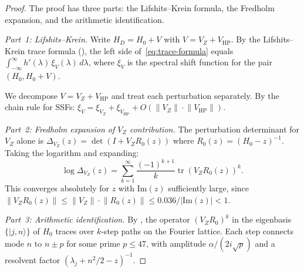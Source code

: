 \documentclass[11pt,a4paper]{article}
\theoremstyle{plain}
\theoremstyle{remark}
\DeclareMathOperator{\tr}{tr}
\newcommand{\norm}[1]{\lVert #1 \rVert}
\begin{document}
\begin{proof}
The proof has three parts: the Lifshits--Krein formula, the Fredholm
expansion, and the arithmetic identification.

\emph{Part~1: Lifshits--Krein.}
Write $H_D=H_0+V$ with $V=V_Z+V_{\mathrm{HP}}$. By the Lifshits--Krein
trace formula (), the left side of~\eqref{eq:trace-formula}
equals
$\int_{-\infty}^\infty h'(\lambda)\,\xi_V(\lambda)\,d\lambda$,
where $\xi_V$ is the spectral shift function for the pair $(H_0,H_0+V)$.

We decompose $V=V_Z+V_{\mathrm{HP}}$ and treat each perturbation separately.
By the chain rule for SSFs: $\xi_V=\xi_{V_Z}+\xi_{V_{\mathrm{HP}}}+O(\norm{V_Z}\cdot\norm{V_{\mathrm{HP}}})$.

\emph{Part~2: Fredholm expansion of $V_Z$ contribution.}
The perturbation determinant for $V_Z$ alone is
$\Delta_{V_Z}(z)=\det(I+V_Z R_0(z))$ where $R_0(z)=(H_0-z)^{-1}$.
Taking the logarithm and expanding:
\begin{equation}\label{eq:fredholm}
  \log\Delta_{V_Z}(z)=\sum_{k=1}^\infty\frac{(-1)^{k+1}}{k}\tr(V_Z R_0(z))^k.
\end{equation}
This converges absolutely for $z$ with $\mathrm{Im}(z)$
sufficiently large, since $\norm{V_Z R_0(z)}\leq\norm{V_Z}\cdot\norm{R_0(z)}
\leq 0.036/|\mathrm{Im}(z)|<1$.

%
%

\emph{Part~3: Arithmetic identification.}
By , the operator $(V_Z R_0)^k$ in the eigenbasis
$\{|j,n\rangle\}$ of $H_0$ traces over $k$-step paths on the Fourier
lattice.  Each step connects mode $n$ to $n\pm p$ for some prime $p\leq 47$,
with amplitude $\alpha/(2i\sqrt{p})$ and a resolvent factor
$(\lambda_j+n^2/2-z)^{-1}$.


\end{proof}
\end{document}
